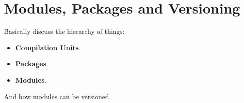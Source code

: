 \section{Modules, Packages and Versioning}
Basically discuss the hierarchy of things:
\begin{itemize}
\item {\bf Compilation Units}.
\item {\bf Packages}.
\item {\bf Modules}.
\end{itemize}
And how modules can be versioned.